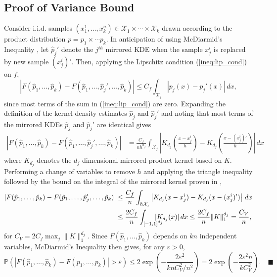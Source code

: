 \documentclass{article} %
\renewcommand{\qed}{\quad \ensuremath{\blacksquare}}    %
\newcommand{\e}{\varepsilon}                        %
\newcommand{\X}{\mathcal{X}}                        %
\begin{document}
\subsection{Proof of Variance Bound}
Consider i.i.d. samples $(x^1_1,\dots,x^n_k) \in \X_1\times\cdots\times\X_k$
drawn according to the product distribution $p = p_1 \times \cdots p_k$. In
anticipation of using McDiarmid's Inequality \citep{McDiarmid1989}, let
$\hat p_j'$ denote the $j^{th}$ mirrored KDE when the sample $x^i_j$ is
replaced by new sample $(x^i_j)'$. Then, applying the Lipschitz condition
(\ref{ineq:lip_cond}) on $f$,
\[|F(\hat p_1,\dots,\hat p_k) - F(\hat p_1,\dots,\hat p_j',\dots,\hat p_k)|
    \leq C_f\int_{\X_j} |p_j(x) - p_j'(x)| \, dx,
\]
since most terms of the sum in (\ref{ineq:lip_cond}) are zero. Expanding the
definition of the kernel density estimates $\hat p_j$ and $\hat p_j'$ and
noting that most terms of the mirrored KDEs $\hat p_j$ and $\hat p_j'$ are
identical gives
\begin{align*}
|F(\hat p_1,\dots,\hat p_k) - F(\hat p_1,\dots,\hat p_j',\dots,\hat p_k)|
 &  = \frac{C_f}{nh^{d_j}} \int_{\X_j} \left|
        K_{d_j}\left( \frac{x - x^i_j}{h} \right)
            - K_{d_j}\left( \frac{x - (x^i_j)'}{h} \right) \right| \, dx
\end{align*}
where $K_{d_j}$ denotes the $d_j$-dimensional mirrored product kernel based on
$K$. Performing a change of variables to remove $h$ and applying the triangle
inequality followed by the bound on the integral of the mirrored kernel proven
in \citep{singh14exponential},
\begin{align}
\notag
|F(\hat p_1,\dots,\hat p_k) - F(\hat p_1,\dots,\hat p_j',\dots,\hat p_k)|
 &  \leq \frac{C_f}{n} \int_{h\X_j}
            \left| K_{d_j}(x - x^i_j) - K_{d_j}(x - (x^i_j)')\right| \, dx  \\
 &  \leq \frac{2C_f}{n} \int_{[-1,1]^{d_j}} \hspace{-5mm}|K_{d_j}(x)| \, dx
    \leq \frac{2C_f}{n} \|K\|_1^{d_j}
    = \frac{C_V}{n},
\label{ineq:mcd_cond}
\end{align}
for $C_V = 2C_f \max_j \|K\|_1^{d_j}$. Since $F(\hat p_1,\dots,\hat p_k)$
depends on $kn$ independent variables, McDiarmid's Inequality then gives, for
any $\e > 0$,
\[\mathbb{P}\left( |F(\hat p_1,\dots,\hat p_k) - F(p_1,\dots,p_k)| > \e \right)
    \leq 2\exp\left( -\frac{2\e^2}{knC_V^2/n^2} \right)
    = 2\exp\left( -\frac{2\e^2n}{kC_V^2} \right). \qed
\]
\end{document}
